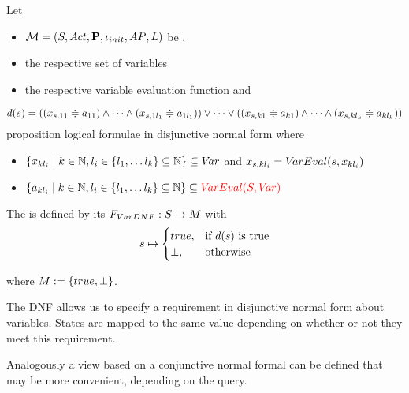\documentclass[preview]{standalone}
\begin{document}
\begin{definition}
	Let 
	\begin{itemize}
		\item $\chgph = \chgphtuple$ be \achgphN,
		\item \vars the respective set of variables 
		\item \vareval the respective variable evaluation function and		
	\end{itemize}
	\[
	d(s) = ((\varstate[,11] \eqorneq \varval_{11}) \land \dots \land (\varstate[,1l_1] \eqorneq \varval_{1l_1})) \lor \dots \lor ((\varstate[,k1] \eqorneq \varval_{k1}) \land \dots \land (\varstate[,kl_k]  \eqorneq \varval_{kl_k}))
	\]
	proposition logical formulae in disjunctive normal form where
	\begin{itemize}
		\item $\{\var_{kl_i} \mid k \in \natnums, l_i \in \{l_1, \dots l_k\} \subseteq \natnums\} \subseteq \vars$ and $\varstate[,kl_i] = \vareval(\state, \var_{kl_i})$
		\item $\{\varval_{kl_i} \mid k \in \natnums, l_i \in \{l_1, \dots l_k\} \subseteq \natnums\} \subseteq \redcomment{\vareval(\states,\vars)}$
	\end{itemize}
	The \viewN \viewparamdnf is defined by its \grpfctN $\gfctparamdnf : \states \to \imggrp$ with
	\[
	\state \mapsto
	\begin{cases}
		true, &\text{if } d(s) \text{ is true}\\
		\remelem, 	&\text{otherwise}
	\end{cases}
	\]
	
	where $\imggrp := \{true, \remelem\}$.
\end{definition}


The DNF allows us to specify a requirement in disjunctive normal form about variables. States are mapped to the same value depending on whether or not they meet this requirement.


Analogously a view based on a conjunctive normal formal can be defined that may be more convenient, depending on the query.
\end{document}
